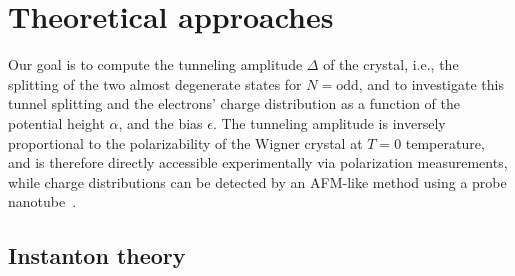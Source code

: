 \documentclass[aps, prb, floatfix, twocolumn, notitlepage, superscriptaddress, 10pt]{revtex4-2}
\newcommand{\1}{{1\hspace*{-0.5ex} \textrm{l} \hspace*{0.5ex}}}
\begin{document}
%






\section{Theoretical approaches}\label{sec:numerics}

Our goal is to compute the tunneling amplitude $\Delta$ of the crystal, 
i.e., the splitting of the two almost degenerate states for $N=\text{odd}$, and to investigate this 
tunnel splitting and the electrons' charge distribution as a function of the  potential  height $\alpha$, and the bias $\epsilon$.
The tunneling amplitude is inversely proportional to   the polarizability of the Wigner crystal at $T=0$ temperature, 
and is therefore directly accessible experimentally via polarization measurements, while  
charge distributions can be detected by an AFM-like method using 
a probe nanotube~\cite{Shapir.2019}.  


\subsection{Instanton theory}\label{sec:IT}
\end{document}
